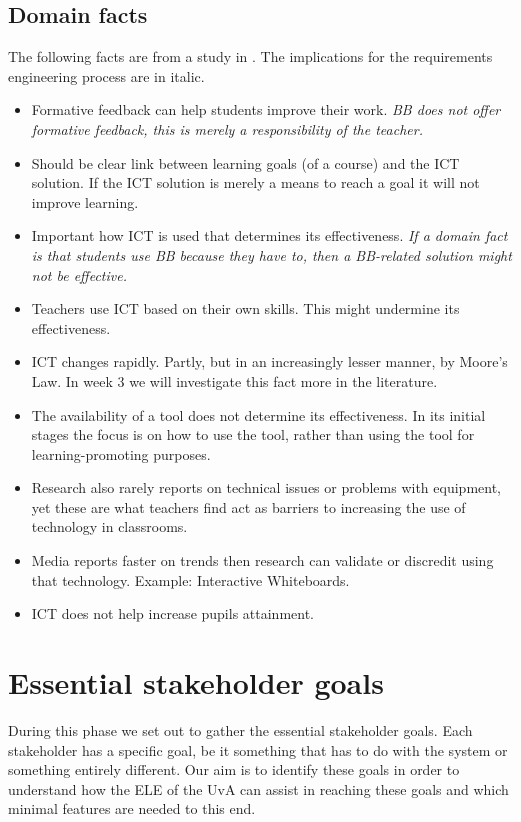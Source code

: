 \section{Domain facts}
The following facts are from a study in \cite{ict_study}. The implications for the requirements engineering process are in italic.
\begin{itemize}
	\item Formative feedback can help students improve their work. \textit{BB does not offer formative feedback, this is merely a responsibility of the teacher.}
	\item Should be clear link between learning goals (of a course) and the ICT solution. If the ICT solution is merely a means to reach a goal it will not improve learning. 
	\item Important how ICT is used that determines its effectiveness. \textit{If a domain fact is that students use BB because they have to, then a BB-related solution might not be effective.}
	\item Teachers use ICT based on their own skills. This might undermine its effectiveness.
	\item ICT changes rapidly. Partly, but in an increasingly lesser manner, by Moore's Law. In week 3 we will investigate this fact more in the literature.
	\item The availability of a tool does not determine its effectiveness. In its initial stages the focus is on how to use the tool, rather than using the tool for learning-promoting purposes.
	\item Research also rarely reports on technical issues or problems with equipment, yet these are what teachers find act as barriers to increasing the use of technology in classrooms.
	\item Media reports faster on trends then research can validate or discredit using that technology. Example: Interactive Whiteboards. 
	\item ICT does not help increase pupils attainment.
\end{itemize}



\chapter{Essential stakeholder goals}\label{stakeholder_goals}
During this phase we set out to gather the essential stakeholder goals. Each stakeholder has a specific goal, be it something that has to do with the system or something entirely different. Our aim is to identify these goals in order to understand how the ELE of the UvA can assist in reaching these goals and which minimal features are needed to this end.

